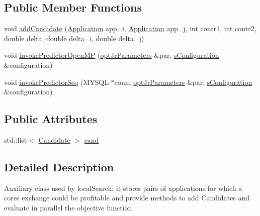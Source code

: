 \subsection*{Public Member Functions}
\begin{DoxyCompactItemize}
\item 
void \hyperlink{classsCandidates_ae71fd23dda6a91a774ae6e61147bcf59}{add\-Candidate} (\hyperlink{classApplication}{Application} app\-\_\-i, \hyperlink{classApplication}{Application} app\-\_\-j, int contr1, int contr2, double delta, double delta\-\_\-i, double delta\-\_\-j)
\item 
void \hyperlink{classsCandidates_ac5ff86e5acf736ef57a3eb25c0d724ab}{invoke\-Predictor\-Open\-M\-P} (\hyperlink{classoptJrParameters}{opt\-Jr\-Parameters} \&par, \hyperlink{readConfigurationFile_8hh_ab8f35b1da3261263c5e9c0e7c8921f5c}{s\-Configuration} \&configuration)
\item 
void \hyperlink{classsCandidates_a79ab5675418a37532bf447cfa8baf975}{invoke\-Predictor\-Seq} (M\-Y\-S\-Q\-L $\ast$conn, \hyperlink{classoptJrParameters}{opt\-Jr\-Parameters} \&par, \hyperlink{readConfigurationFile_8hh_ab8f35b1da3261263c5e9c0e7c8921f5c}{s\-Configuration} \&configuration)
\end{DoxyCompactItemize}
\subsection*{Public Attributes}
\begin{DoxyCompactItemize}
\item 
std\-::list$<$ \hyperlink{classCandidate}{Candidate} $>$ \hyperlink{classsCandidates_a71334f188ac386cd5958508288487832}{cand}
\end{DoxyCompactItemize}


\subsection{Detailed Description}
Auxiliary class used by local\-Search; it stores pairs of applications for which a cores exchange could be profitable and provide methods to add Candidates and evaluate in parallel the objective function 

